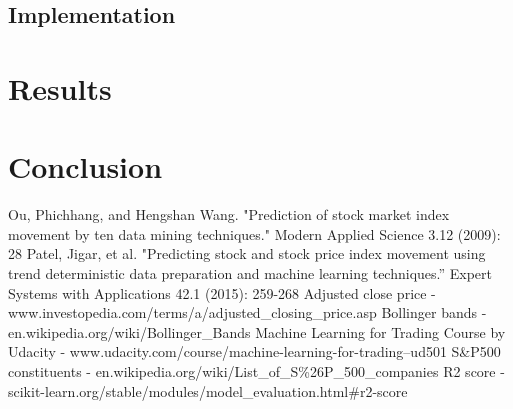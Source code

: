 \documentclass[10pt]{report}
\begin{document}
\subsection*{Implementation}

\section{Results}

\section{Conclusion}

\begin{thebibliography}{}

Ou, Phichhang, and Hengshan Wang. "Prediction of stock market index movement by ten data mining techniques." Modern Applied Science 3.12 (2009): 28
Patel, Jigar, et al. "Predicting stock and stock price index movement using trend deterministic data preparation and machine learning techniques.” Expert Systems with Applications 42.1 (2015): 259-268
Adjusted close price - www.investopedia.com/terms/a/adjusted\_closing\_price.asp
Bollinger bands - en.wikipedia.org/wiki/Bollinger\_Bands
Machine Learning for Trading Course by Udacity - www.udacity.com/course/machine-learning-for-trading--ud501
S\&P500 constituents - en.wikipedia.org/wiki/List\_of\_S\%26P\_500\_companies
R2 score - scikit-learn.org/stable/modules/model\_evaluation.html\#r2-score

\end{thebibliography}
\end{document}
